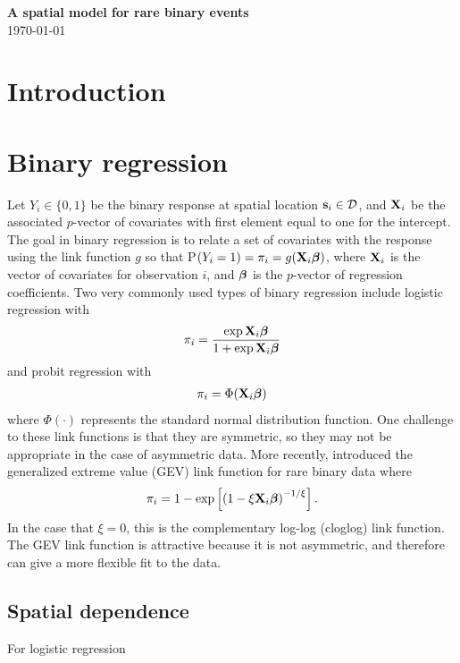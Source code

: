 \documentclass[11pt]{article}
\begin{document}
\linenumbers

\begin{center}
{\Large {\bf A spatial model for rare binary events}}\\
\today
\end{center}

\section{Introduction}\label{s:intro}

\section{Binary regression}\label{s:model}
Let $Y_i\in\{0,1\}$ be the binary response at spatial location $\mbox{\bf s}_i \in {\cal D}$, and $\mbox{\bf X}_i$ be the associated $p$-vector of covariates with first element equal to one for the intercept.
The goal in binary regression is to relate a set of covariates with the response using the link function $g$ so that P$(Y_i=1) = \pi_i= g(\mbox{\bf X}_i \mbox{\boldmath $\beta$})$, where $\mbox{\bf X}_i$ is the vector of covariates for observation $i$, and $\mbox{\boldmath $\beta$}$ is the $p$-vector of regression coefficients.
Two very commonly used types of binary regression include logistic regression with
\begin{align}
  \pi_i = \frac{ \exp{ \mbox{\bf X}_i  \mbox{\boldmath $\beta$}} }{1 + \exp{ \mbox{\bf X}_i  \mbox{\boldmath $\beta$}}}
\end{align}
and probit regression with
\begin{align}
  \pi_i = \Phi(\mbox{\bf X}_i \mbox{\boldmath $\beta$})
\end{align}
where $\Phi(\cdot)$ represents the standard normal distribution function.
One challenge to these link functions is that they are symmetric, so they may not be appropriate in the case of asymmetric data.
More recently, \cite{Wang-2010} introduced the generalized extreme value (GEV) link function for rare binary data where
\begin{align}
  \pi_i= 1-\exp\left[\left(1-\xi\mbox{\bf X}_i\mbox{\boldmath $\beta$}\right)^{-1/\xi}\right].
\end{align}
In the case that $\xi = 0$, this is the complementary log-log (cloglog) link function.
The GEV link function is attractive because it is not asymmetric, and therefore can give a more flexible fit to the data.

\subsection{Spatial dependence}\label{s:spatialdependence}
For logistic regression
\end{document}
